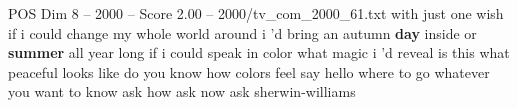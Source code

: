 \begin{textsample}{POS Dim 8 – 2000 – Score 2.00 – 2000/tv\_com\_2000\_61.txt}  \label{ex:f8_pos_034}
with just one wish if i could change my whole world around i 'd bring an autumn \textbf{day} inside or \textbf{summer} all year long if i could speak in color what magic i 'd reveal is this what peaceful looks like do you know how colors feel say hello where to go whatever you want to know ask how ask now ask sherwin-williams

\end{textsample}
